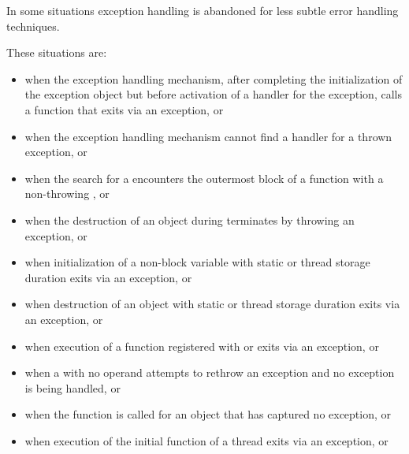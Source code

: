 \pnum
{}%
In some situations exception handling is abandoned
for less subtle error handling techniques.
\begin{note}
These situations are:
%
\begin{itemize}
\item%
when the exception handling mechanism, after completing
the initialization of the exception object
but before
activation of a handler for the exception,
calls a function that exits
via an exception, or

\item%
when the exception handling mechanism cannot find a handler for a thrown exception, or

\item when the search for a  encounters the
outermost block of a function
with a non-throwing , or

\item%
when the destruction of an object during 
terminates by throwing an exception, or

\item%
when initialization of a non-block
variable with static or thread storage duration
exits via an exception, or

\item%
when destruction of an object with static or thread storage duration exits
via an exception, or

\item%
when execution of a function registered with
 or 
exits via an exception, or

\item%
when a
with no operand attempts to rethrow an exception and no exception is being
handled, or

\item%
when the function  is called for an object
that has captured no exception, or

\item%
when execution of the initial function of a thread exits via
an exception, or


\end{itemize}
\end{note}
